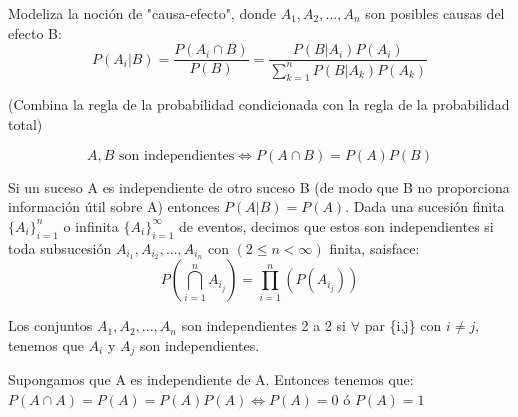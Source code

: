 \documentclass{apuntes}
\begin{document}
\begin{defn}
Modeliza la noción de "causa-efecto", donde $A_1, A_2,...,A_n$ son posibles causas del efecto B:
\[
P(A_i|B)= \frac{P(A_i\cap B)}{P(B)}= \frac{P(B|A_i)P(A_i)}{\sum_{k=1}^{n}P(B|A_k)P(A_k)}
\]

(Combina la regla de la probabilidad condicionada con la regla de la probabilidad total)
\end{defn}

\begin{defn}[Independencia]
\[
A,B \text{ son independientes} \Leftrightarrow P(A \cap B)=P(A)P(B)
\]

\obs Si un suceso A es independiente de otro suceso B (de modo que B no proporciona información útil sobre A) entonces $P(A|B)=P(A)$.
\obs Dada una sucesión finita $\{A_i\}_{i=1}^{n}$ o infinita $\{A_i\}_{i=1}^\infty$ de eventos, decimos que estos son independientes si toda subsucesión $A_{i_1}, A_{i_2},..., A_{i_n}$ con $(2 \leq n < \infty)$ finita, saisface:
\[
P(\bigcap_{i=1}^nA_{i_j})=\prod_{i=1}^{n}(P(A_{i_j}))
\]

\obs Los conjuntos $A_1, A_2,...,A_n$ son independientes 2 a 2 si $\forall$ par \{i,j\} con $i \neq j$, tenemos que $A_i$ y $A_j$ son independientes.

\begin{example}
Supongamos que A es independiente de A. Entonces tenemos que: $P(A\cap A)=P(A)=P(A)P(A) \Leftrightarrow P(A)=0$ ó $P(A)=1$
\end{example}
\end{defn}
\end{document}
